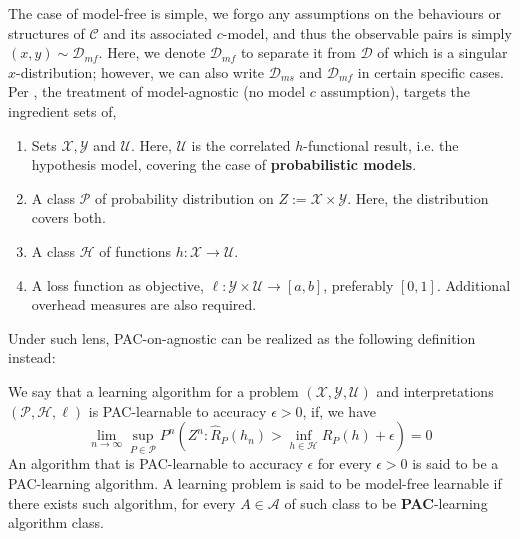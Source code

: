 \documentclass[
  journal=largetwo,
  year=2025,
  volume=37,
]{cup-journal}
\begin{document}
The case of model-free is simple, we forgo any assumptions on the behaviours or structures of $\mathcal{C}$ and its associated $c$-model, and thus the observable pairs is simply $(x,y)\sim\mathcal{D}_{mf}$. Here, we denote $\mathcal{D}_{mf}$ to separate it from $\mathcal{D}$ of which is a singular $x$-distribution; however, we can also write $\mathcal{D}_{ms}$ and $\mathcal{D}_{mf}$ in certain specific cases. Per \cite{STL_Hajek_Maxim_2021}, the treatment of model-agnostic (no model $c$ assumption), targets the ingredient sets of, 
\begin{enumerate}
    \item Sets $\mathcal{X}, \mathcal{Y}$ and $\mathcal{U}$. Here, $\mathcal{U}$ is the correlated $h$-functional result, i.e. the hypothesis model, covering the case of \textbf{probabilistic models}. 
    \item A class $\mathcal{P}$ of probability distribution on $Z:=\mathcal{X}\times \mathcal{Y}$. Here, the distribution covers both. 
    \item A class $\mathcal{H}$ of functions $h:\mathcal{X}\to\mathcal{U}$. 
    \item A loss function as objective, $\ell: \mathcal{Y}\times \mathcal{U}\to[a,b]$, preferably $[0,1]$. Additional overhead measures are also required. 
\end{enumerate}
Under such lens, PAC-on-agnostic can be realized as the following definition instead: 
\begin{definition}
    We say that a learning algorithm for a problem $(\mathcal{X},\mathcal{Y},\mathcal{U})$ and interpretations $(\mathcal{P},\mathcal{H},\ell)$ is PAC-learnable to accuracy $\epsilon > 0$, if, we have 
    \begin{equation}
        \lim_{n\to \infty}\sup_{P\in \mathcal{P}} P^{n} \left(Z^n : \hat{R}_{P}(h_{n})>\inf_{h\in\mathcal{H}} R_{P}(h)+\epsilon\right) = 0
    \end{equation}
    An algorithm that is PAC-learnable to accuracy $\epsilon$ for every $\epsilon >0$ is said to be a PAC-learning algorithm. A learning problem is said to be model-free learnable if there exists such algorithm, for every $A\in\mathcal{A}$ of such class to be \textbf{PAC}-learning algorithm class. 
\end{definition}
\end{document}
